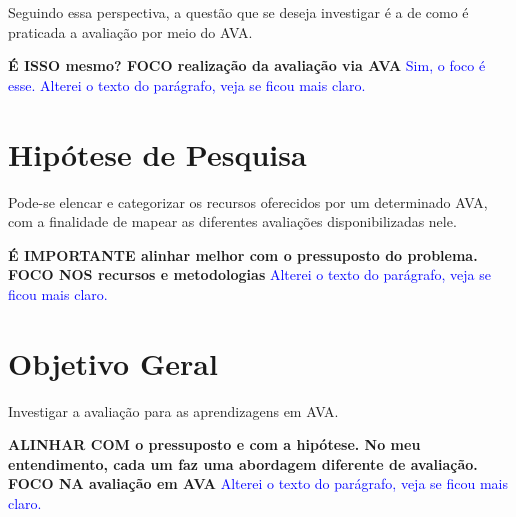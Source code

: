 Seguindo essa perspectiva, a questão que se deseja investigar é a de como é praticada a avaliação por meio do AVA. 


\textbf{É ISSO mesmo? FOCO realização da avaliação via AVA} \textcolor{blue}{Sim, o foco é esse. Alterei o texto do parágrafo, veja se ficou mais claro.}

\section{Hipótese de Pesquisa}%

Pode-se elencar e categorizar os recursos oferecidos por um determinado AVA, com a finalidade de mapear as diferentes avaliações disponibilizadas nele. 


\textbf{É IMPORTANTE alinhar melhor com o pressuposto do problema. FOCO NOS recursos e metodologias} \textcolor{blue}{Alterei o texto do parágrafo, veja se ficou mais claro.}


\section{Objetivo Geral}%

Investigar a avaliação para as aprendizagens em AVA.

\textbf{ ALINHAR COM o pressuposto e com a hipótese. No meu entendimento, cada um faz uma abordagem diferente de avaliação. FOCO NA avaliação em AVA} \textcolor{blue}{Alterei o texto do parágrafo, veja se ficou mais claro.}


